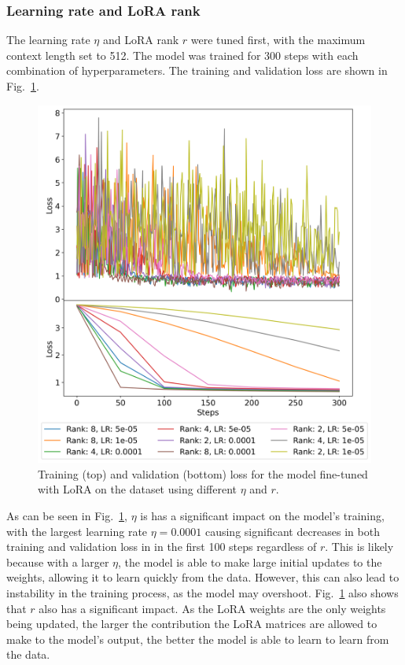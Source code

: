 \documentclass[11pt,a4paper]{article}
\begin{document}
\subsubsection{Learning rate and LoRA rank}
\label{sec:lora_lr}
The learning rate $\eta$ and LoRA rank $r$ were tuned first, with the maximum context length set to 512. The model was trained for 300 steps with each combination of hyperparameters. The training and validation loss are shown in Fig.~\ref{fig:lora_lr_rank_loss}.

\begin{figure}
    \centering
    \includegraphics[width=\columnwidth, keepaspectratio]{../plots/lora_lr_rank_loss.png}
    \caption{Training (top) and validation (bottom) loss for the model fine-tuned with LoRA on the dataset using different $\eta$ and $r$.}
    \label{fig:lora_lr_rank_loss}
\end{figure}

As can be seen in Fig.~\ref{fig:lora_lr_rank_loss}, $\eta$ is has a significant impact on the model's training, with the largest learning rate $\eta=0.0001$ causing significant decreases in both training and validation loss in in the first 100 steps regardless of $r$. This is likely because with a larger $\eta$, the model is able to make large initial updates to the weights, allowing it to learn quickly from the data. However, this can also lead to instability in the training process, as the model may overshoot. Fig.~\ref{fig:lora_lr_rank_loss} also shows that $r$ also has a significant impact. As the LoRA weights are the only weights being updated, the larger the contribution the LoRA matrices are allowed to make to the model's output, the better the model is able to learn to learn from the data.
\end{document}
